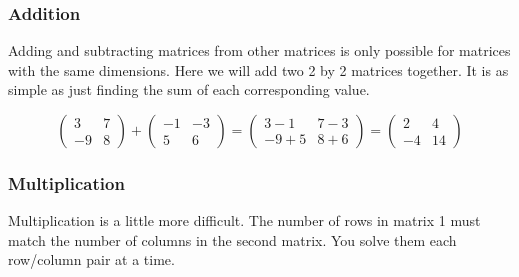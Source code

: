 \hypertarget{addition}{%
\subsubsection{Addition}\label{addition}}

Adding and subtracting matrices from other matrices is only possible for matrices with the same dimensions. Here we will add two 2 by 2 matrices together. It is as simple as just finding the sum of each corresponding value.

\[\begin{pmatrix}3&7\\-9&8\end{pmatrix}+\begin{pmatrix}-1&-3\\5&6\end{pmatrix}=\begin{pmatrix}3-1&7-3\\-9+5&8+6\end{pmatrix}=\begin{pmatrix}2&4\\-4&14\end{pmatrix}\]

\hypertarget{multiplication}{%
\subsubsection{Multiplication}\label{multiplication}}

Multiplication is a little more difficult. The number of rows in matrix 1 must match the number of columns in the second matrix. You solve them each row/column pair at a time.

